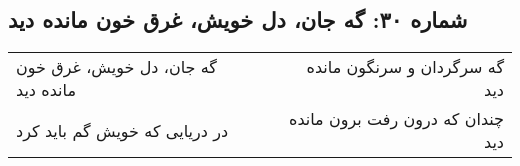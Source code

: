 \begin{center}
\section*{شماره ۳۰: گه جان، دل خویش، غرق خون مانده دید}
\label{sec:030}
\begin{longtable}{l p{0.5cm} r}
گه جان، دل خویش، غرق خون مانده دید
&&
گه سرگردان و سرنگون مانده دید
\\
در دریایی که خویش گم باید کرد
&&
چندان که درون رفت برون مانده دید
\\
\end{longtable}
\end{center}
